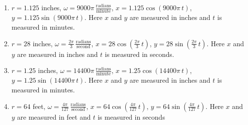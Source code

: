 \documentclass{ximera}
\begin{document}
\begin{enumerate}

\setcounter{enumi}{\value{HW}}

\item   $r = 1.125$ inches, $\omega = 9000 \pi \, \frac{\text{radians}}{\text{minute}}$,  $x = 1.125 \cos(9000 \pi \, t)$, $y = 1.125 \sin(9000 \pi \, t)$.  Here $x$ and $y$ are measured in inches and $t$ is measured in minutes.

\item   $r = 28$ inches, $\omega = \frac{2\pi}{3} \, \frac{\text{radians}}{\text{second}}$,  $x = 28 \cos\left(\frac{2\pi}{3} \, t \right)$, $y = 28 \sin\left(\frac{2\pi}{3} \, t \right)$.  Here $x$ and $y$ are measured in inches and $t$ is measured in seconds.

\item $r = 1.25$ inches, $\omega = 14400 \pi \, \frac{\text{radians}}{\text{minute}}$,  $x = 1.25 \cos(14400 \pi \, t)$, $y = 1.25 \sin(14400 \pi \, t)$.  Here $x$ and $y$ are measured in inches and $t$ is measured in minutes.

\item  $r = 64$ feet, $\omega = \frac{4\pi}{127} \, \frac{\text{radians}}{\text{second}}$,  $x = 64 \cos\left(\frac{4\pi}{127} \, t \right)$, $y = 64 \sin\left(\frac{4\pi}{127} \, t \right)$.  Here $x$ and $y$ are measured in feet and $t$ is measured in seconds

\end{enumerate}
\end{document}
